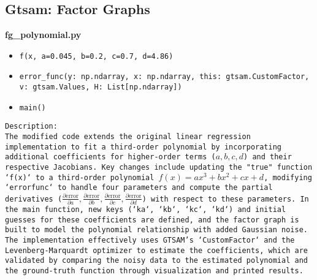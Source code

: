 \documentclass{article}
\begin{document}

\subsection*{Gtsam: Factor Graphs}
\bfseries{fg\_polynomial.py}
\begin{itemize}
    \item \texttt{f(x, a=0.045, b=0.2, c=0.7, d=4.86)}
    \item \texttt{error\_func(y: np.ndarray, x: np.ndarray, this: gtsam.CustomFactor, v: gtsam.Values, H: List[np.ndarray])}
    \item \texttt{main()}
\end{itemize}
\texttt{Description:}\\
\texttt{The modified code extends the original linear regression implementation to fit a third-order polynomial by incorporating additional coefficients for higher-order terms (\(a, b, c, d\)) and their respective Jacobians. Key changes include updating the "true" function `f(x)` to a third-order polynomial \(f(x) = ax^3 + bx^2 + cx + d\), modifying `errorfunc` to handle four parameters and compute the partial derivatives (\(\frac{\partial \text{error}}{\partial a}, \frac{\partial \text{error}}{\partial b}, \frac{\partial \text{error}}{\partial c}, \frac{\partial \text{error}}{\partial d}\)) with respect to these parameters. In the main function, new keys (`ka`, `kb`, `kc`, `kd`) and initial guesses for these coefficients are defined, and the factor graph is built to model the polynomial relationship with added Gaussian noise. The implementation effectively uses GTSAM's `CustomFactor` and the Levenberg-Marquardt optimizer to estimate the coefficients, which are validated by comparing the noisy data to the estimated polynomial and the ground-truth function through visualization and printed results.}
\end{document}
